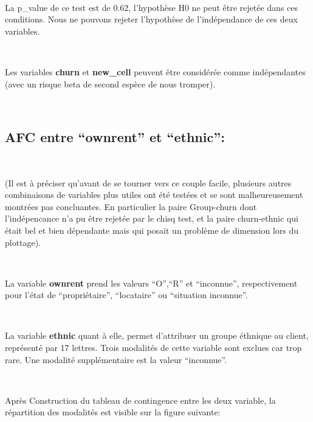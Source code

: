 \documentclass[]{imsart}
\numberwithin{equation}{section}
\theoremstyle{plain}
\begin{document}
~

La p\_value de ce test est de 0.62, l'hypothèse H0 ne peut être rejetée dans ces conditions. Nous ne pouvons rejeter l'hypothèse de l'indépendance de ces deux variables.

~

Les variables \textbf{churn} et \textbf{new\_cell} peuvent être considérée comme indépendantes (avec un risque beta de second espèce de nous tromper).

~

\hypertarget{afc-entre-ownrent-et-ethnic}{%
\subsection{AFC entre ``ownrent'' et ``ethnic'':}\label{afc-entre-ownrent-et-ethnic}}

~

(Il est à préciser qu'avant de se tourner vers ce couple facile, plusieurs autres combinaisons de variables plus utiles ont été testées et se sont malheureusement montrées pas concluantes. En particulier la paire Group-churn dont l'indépencance n'a pu être rejetée par le chisq test, et la paire churn-ethnic qui était bel et bien dépendante mais qui posait un problème de dimension lors du plottage).

~

La variable \textbf{ownrent} prend les valeurs ``O'',``R'' et ``inconnue'', respectivement pour l'état de ``propriétaire'', ``locataire'' ou ``situation inconnue''.

~

La variable \textbf{ethnic} quant à elle, permet d'attribuer un groupe éthnique au client, représenté par 17 lettres. Trois modalités de cette variable sont exclues car trop rare. Une modalité supplémentaire est la valeur ``inconnue''.

~

Après Construction du tableau de contingence entre les deux variable, la répartition des modalités est visible sur la figure suivante:

~
\end{document}
